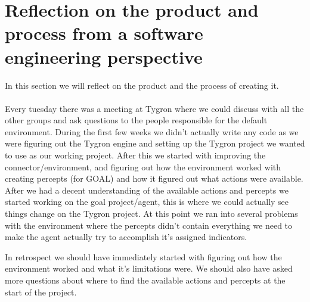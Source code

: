 \chapter{Reflection on the product and process from a software engineering perspective}
In this section we will reflect on the product and the process of creating it.
\\
\\
Every tuesday there was a meeting at Tygron where we could discuss with all the other groups and ask questions to the people responsible for the default environment.
During the first few weeks we didn't actually write any code as we were figuring out the Tygron engine and setting up the Tygron project we wanted to use as our working project. 
After this we started with improving the connector/environment, and figuring out how the environment worked with creating percepts (for GOAL) and how it figured out what actions were available.
After we had a decent understanding of the available actions and percepts we started working on the goal project/agent, this is where we could actually see things change on the Tygron project.
At this point we ran into several problems with the environment where the percepts didn't contain everything we need to make the agent actually try to accomplish it's assigned indicators.

In retrospect we should have immediately started with figuring out how the environment worked and what it's limitations were.
We should also have asked more questions about where to find the available actions and percepts at the start of the project.